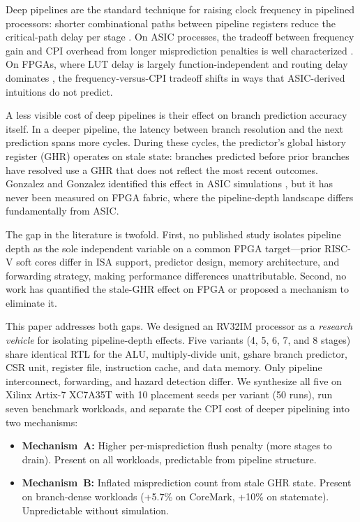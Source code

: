 \documentclass[journal]{IEEEtran}
\begin{document}
Deep pipelines are the standard technique for raising clock frequency in pipelined processors: shorter combinational paths between pipeline registers reduce the critical-path delay per stage \cite{hennessy2017computer}. On ASIC processes, the tradeoff between frequency gain and CPI overhead from longer misprediction penalties is well characterized \cite{hrishikesh2002optimal, sprangle2002increasing}. On FPGAs, where LUT delay is largely function-independent and routing delay dominates \cite{xilinx_7series, boutros2020fpga, kuon2007measuring}, the frequency-versus-CPI tradeoff shifts in ways that ASIC-derived intuitions do not predict.

A less visible cost of deep pipelines is their effect on branch prediction accuracy itself. In a deeper pipeline, the latency between branch resolution and the next prediction spans more cycles. During these cycles, the predictor's global history register (GHR) operates on stale state: branches predicted before prior branches have resolved use a GHR that does not reflect the most recent outcomes. Gonzalez and Gonzalez identified this effect in ASIC simulations \cite{gonzalez1999power}, but it has never been measured on FPGA fabric, where the pipeline-depth landscape differs fundamentally from ASIC.

The gap in the literature is twofold. First, no published study isolates pipeline depth as the sole independent variable on a common FPGA target---prior RISC-V soft cores differ in ISA support, predictor design, memory architecture, and forwarding strategy, making performance differences unattributable. Second, no work has quantified the stale-GHR effect on FPGA or proposed a mechanism to eliminate it.

This paper addresses both gaps. We designed an RV32IM processor as a \emph{research vehicle} for isolating pipeline-depth effects. Five variants (4, 5, 6, 7, and 8 stages) share identical RTL for the ALU, multiply-divide unit, gshare branch predictor, CSR unit, register file, instruction cache, and data memory. Only pipeline interconnect, forwarding, and hazard detection differ. We synthesize all five on Xilinx Artix-7 XC7A35T with 10 placement seeds per variant (50 runs), run seven benchmark workloads, and separate the CPI cost of deeper pipelining into two mechanisms:
\begin{itemize}
\item \textbf{Mechanism~A:} Higher per-misprediction flush penalty (more stages to drain). Present on all workloads, predictable from pipeline structure.
\item \textbf{Mechanism~B:} Inflated misprediction count from stale GHR state. Present on branch-dense workloads (+5.7\% on CoreMark, +10\% on statemate). Unpredictable without simulation.
\end{itemize}
\end{document}
